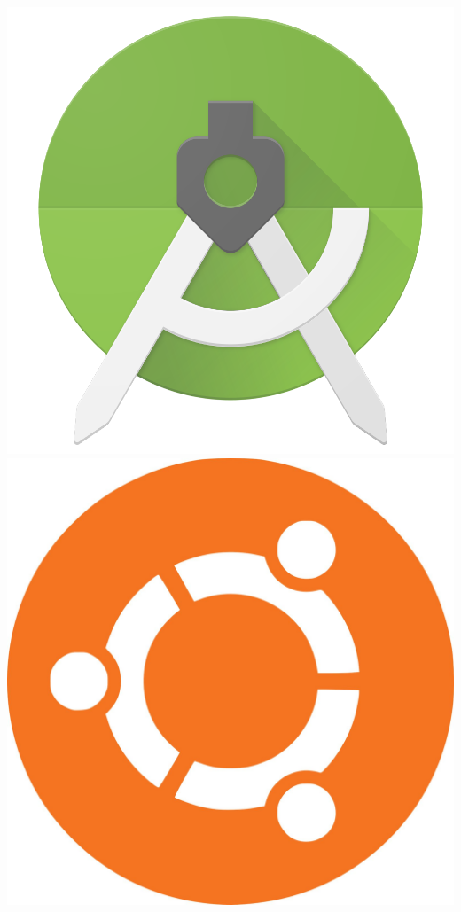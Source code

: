 \documentclass[12pt,a4paper,UTF8]{article}
\theoremstyle{definition}
\numberwithin{equation}{section}
\numberwithin{figure}{section}
\begin{document}
\begin{center}
\includegraphics[scale=0.3]{Android.png}\\
\includegraphics[scale=0.14]{ubuntu.jpg}
\end{center}
\end{document}
